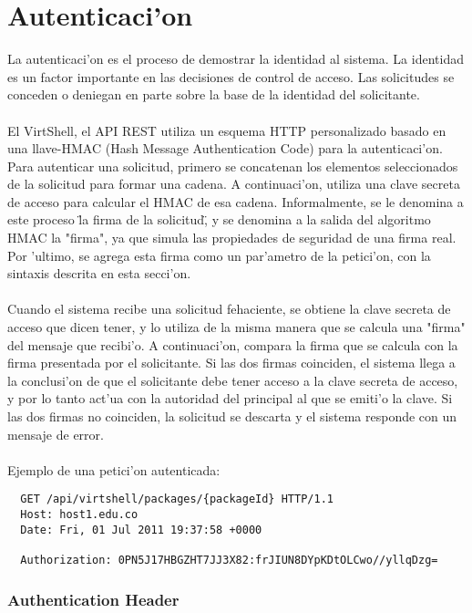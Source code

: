 \chapter{Autenticaci'on}
\label{capauthentication}

La autenticaci'on es el proceso de demostrar la identidad al sistema. La identidad es un factor importante en las decisiones de control de acceso. Las solicitudes se conceden o deniegan en parte sobre la base de la identidad del solicitante.\\
\\
El VirtShell, el API REST utiliza un esquema HTTP personalizado basado en una llave-HMAC (Hash Message Authentication Code) para la autenticaci'on. Para autenticar una solicitud, primero se concatenan los elementos seleccionados de la solicitud para formar una cadena. A continuaci'on, utiliza una clave secreta de acceso para calcular el HMAC de esa cadena. Informalmente, se le denomina a este proceso \"la firma de la solicitud\", y se denomina a la salida del algoritmo HMAC la "firma", ya que simula las propiedades de seguridad de una firma real. Por 'ultimo, se agrega esta firma como un par'ametro de la petici'on, con la sintaxis descrita en esta secci'on.\\
\\
Cuando el sistema recibe una solicitud fehaciente, se obtiene la clave secreta de acceso que dicen tener, y lo utiliza de la misma manera que se calcula una "firma" del mensaje que recibi'o. A continuaci'on, compara la firma que se calcula con la firma presentada por el solicitante. Si las dos firmas coinciden, el sistema llega a la conclusi'on de que el solicitante debe tener acceso a la clave secreta de acceso, y por lo tanto act'ua con la autoridad del principal al que se emiti'o la clave. Si las dos firmas no coinciden, la solicitud se descarta y el sistema responde con un mensaje de error.\\
\\
Ejemplo de una petici'on autenticada:

\medskip
\begin{lstlisting}
  GET /api/virtshell/packages/{packageId} HTTP/1.1
  Host: host1.edu.co
  Date: Fri, 01 Jul 2011 19:37:58 +0000

  Authorization: 0PN5J17HBGZHT7JJ3X82:frJIUN8DYpKDtOLCwo//yllqDzg= 
\end{lstlisting}

\subsection{Authentication Header}

